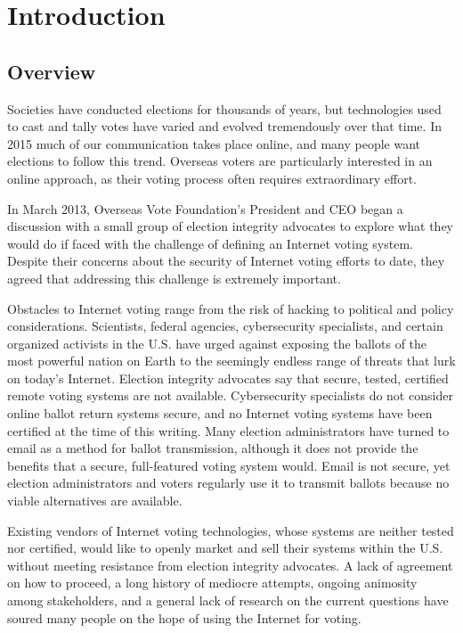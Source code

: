 \chapter{Introduction}
\label{chapter:introduction}

\section{Overview}
Societies have conducted elections for thousands of years, but
technologies used to cast and tally votes have varied and evolved
tremendously over that time. In 2015 much of our communication takes
place online, and many people want elections to follow this
trend. Overseas voters are particularly interested in an online
approach, as their voting process often requires extraordinary effort.

In March 2013, Overseas Vote Foundation’s President and CEO began a
discussion with a small group of election integrity advocates to
explore what they would do if faced with the challenge of defining an
Internet voting system. Despite their concerns about the security of
Internet voting efforts to date, they agreed that addressing this
challenge is extremely important. 

Obstacles to Internet voting range from the risk of hacking to
political and policy considerations. Scientists, federal agencies,
cybersecurity specialists, and certain organized activists in the
U.S. have urged against exposing the ballots of the most powerful
nation on Earth to the seemingly endless range of threats that lurk on
today’s Internet. Election integrity advocates say that secure,
tested, certified remote voting systems are not
available. Cybersecurity specialists do not consider online ballot
return systems secure, and no Internet voting systems have been
certified at the time of this writing. Many election administrators
have turned to email as a method for ballot transmission, although it
does not provide the benefits that a secure, full-featured voting
system would. Email is  not secure, yet election administrators and
voters regularly use it to transmit ballots because no viable
alternatives are available. 

Existing vendors of Internet voting technologies, whose systems are
neither tested nor certified, would like to openly market and sell
their systems within the U.S. without meeting resistance from election
integrity advocates. A lack of agreement on how to proceed, a long
history of mediocre attempts, ongoing animosity among stakeholders,
and a general lack of research on the current questions have soured
many people on the hope of using the Internet for voting.

